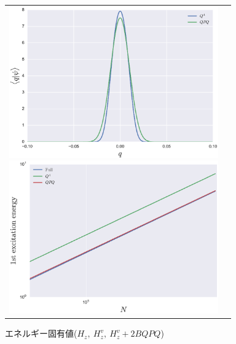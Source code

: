 \documentclass[10.5pt,a4paper]{jreport}
\begin{document}
\begin{figure}[H]
  \begin{tabular}{cc}
    \begin{minipage}{0.5\hsize}
      \begin{center}
        \includegraphics[width = 9cm]{./EPS/psi_qpq2.eps}
        \caption{固有関数の絶対値($H_z^v,\ H_z^v + 2BQPQ$)}\label{psi_qpq}
      \end{center}
    \end{minipage}
    \begin{minipage}{0.6\hsize}
      \begin{center}
        \includegraphics[width = 9cm]{./EPS/energy2.eps}
        \caption{エネルギー固有値($H_z,\ H_z^v,\ H_z^v + 2BQPQ$)}\label{energy}
      \end{center}
    \end{minipage}
  \end{tabular}
\end{figure}
\end{document}
